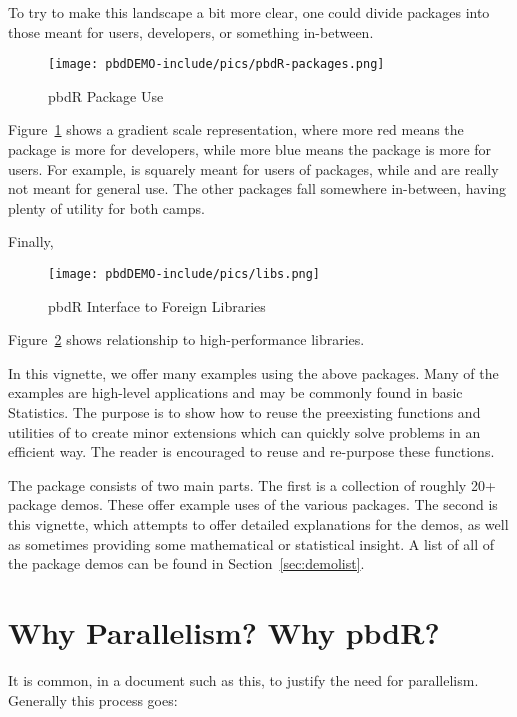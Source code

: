 To try to make this landscape a bit more clear, one could divide
 packages into those meant for users, developers, or
something in-between.  
\begin{figure}[h]
 \centering
 \texttt{[image: pbdDEMO-include/pics/pbdR-packages.png]}
 \caption{pbdR Package Use}
 \label{fig:pbdrpackages2}
\end{figure}
Figure~\ref{fig:pbdrpackages2} shows a gradient scale representation, where
more red means the package is more for developers, while more blue means the
package is more for users.  For example,  is squarely meant for
users of  packages, while  and  are
really not meant for general use. The other packages fall somewhere
in-between, having plenty of utility for both camps.

Finally, 
\begin{figure}[h]
 \centering
 \texttt{[image: pbdDEMO-include/pics/libs.png]}
 \caption{pbdR Interface to Foreign Libraries}
 \label{fig:pbdrlibs}
\end{figure}
Figure~\ref{fig:pbdrlibs} shows  relationship to
high-performance libraries.

In this vignette, we offer many examples using the above 
packages. Many of the examples are high-level applications and may be commonly
found in basic Statistics. The purpose is to show how to reuse the
preexisting functions and utilities of  to create minor
extensions which can quickly solve problems in an efficient way.
The reader is encouraged to reuse and re-purpose these functions.

The  package consists of two main parts. The first is a
collection of roughly 20+ package demos. These offer example uses of
the various  packages. The second is this vignette, which
attempts to offer detailed explanations for the demos, as well as sometimes
providing some mathematical or statistical insight. A list of all of the
package demos can be found in Section~\ref{sec:demolist}.



\section{Why Parallelism?  Why pbdR?}

It is common, in a document such as this, to justify the need for parallelism.
Generally this process goes:

